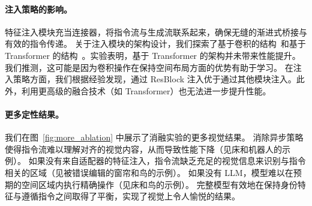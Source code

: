 \paragraph{注入策略的影响。} 特征注入模块充当连接器，将指令流与生成流联系起来，确保无缝的渐进式桥接与有效的指令传递。
关于注入模块的架构设计，我们探索了基于卷积的结构~\cite{zhang2023adding}和基于 Transformer 的结构~\cite{hu2023animate}。实验表明，基于 Transformer 的架构并未带来性能提升。
我们推测，这可能是因为卷积操作在保持空间布局方面的优势有助于学习。
在注入策略方面，我们根据经验发现，通过 ResBlock 注入优于通过其他模块注入。此外，利用更高级的融合技术（如 Transformer）也无法进一步提升性能。

\paragraph{更多定性结果。} 我们在图~\ref{fig:more_ablation} 中展示了消融实验的更多视觉结果。
消除异步策略使得指令流难以理解对齐的视觉内容，从而导致性能下降（见床和机器人的示例）。
如果没有来自适配器的特征注入，指令流缺乏充足的视觉信息来识别与指令相关的区域（见被错误编辑的窗帘和鸟的示例）。
如果没有 LLM，模型难以在预期的空间区域内执行精确操作（见床和鸟的示例）。
完整模型有效地在保持身份特征与遵循指令之间取得了平衡，实现了视觉上令人愉悦的结果。

